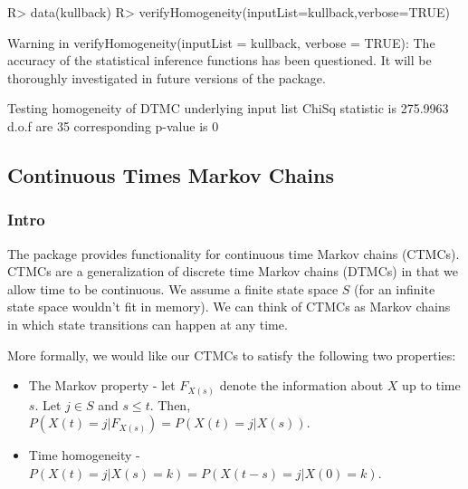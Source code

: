 \documentclass[
  nojss]{jss}
\providecommand{\tightlist}{%
  \setlength{\itemsep}{0pt}\setlength{\parskip}{0pt}}
\begin{document}
\begin{CodeChunk}

\begin{CodeInput}
R> data(kullback)
R> verifyHomogeneity(inputList=kullback,verbose=TRUE)
\end{CodeInput}

\begin{CodeOutput}
Warning in verifyHomogeneity(inputList = kullback, verbose = TRUE): The
accuracy of the statistical inference functions has been questioned. It will be
thoroughly investigated in future versions of the package.
\end{CodeOutput}

\begin{CodeOutput}
Testing homogeneity of DTMC underlying input list 
ChiSq statistic is 275.9963 d.o.f are 35 corresponding p-value is 0 
\end{CodeOutput}

\end{CodeChunk}

\hypertarget{continuous-times-markov-chains}{%
\subsection{Continuous Times Markov Chains}\label{continuous-times-markov-chains}}

\hypertarget{intro}{%
\subsubsection{Intro}\label{intro}}

The  package provides functionality for continuous time Markov chains (CTMCs). CTMCs are a generalization of discrete time Markov chains (DTMCs) in that we allow time to be continuous. We assume a finite state space \(S\) (for an infinite state space wouldn't fit in memory). We can think of CTMCs as Markov chains in which state transitions can happen at any time.

More formally, we would like our CTMCs to satisfy the following two properties:

\begin{itemize}
\tightlist
\item
  The Markov property - let \(F_{X(s)}\) denote the information about \(X\) up to time \(s\). Let \(j \in S\) and \(s \leq t\). Then, \(P(X(t) = j|F_{X(s)}) = P(X(t) = j|X(s))\).
\item
  Time homogeneity - \(P(X(t) = j|X(s) = k) = P(X(t-s) = j|X(0) = k)\).
\end{itemize}
\end{document}
